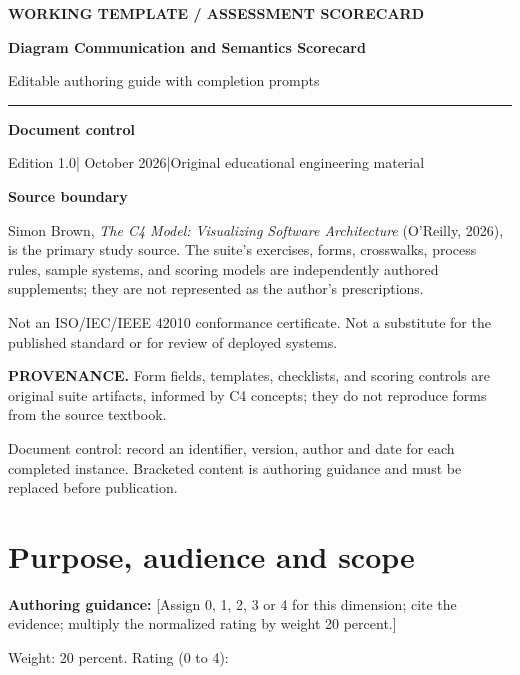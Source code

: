 \documentclass[10pt,letterpaper]{article}
\newcommand{\Prompter}[1]{\par{\small\color{C4Teal}\textbf{Authoring guidance:} #1}\par}
\newcommand{\SourceNote}[1]{\par\smallskip\noindent\colorbox{C4Light}{\parbox{0.94\linewidth}{\footnotesize\textbf{PROVENANCE.} #1}}\par\medskip}
\newcommand{\DocStart}[3]{%
\begin{document}
\begin{titlepage}
\renewcommand{\thepage}{title-\arabic{page}}
\vspace*{0.55in}
{\sffamily\bfseries\small\color{C4Teal}#1}\par\vspace{0.24in}
{\sffamily\bfseries\fontsize{26}{31}\selectfont\color{C4Navy}#2}\par\vspace{0.18in}
{\large\color{C4Gray}#3}\par\vspace{0.4in}
\textcolor{C4Teal}{\rule{\linewidth}{1.15pt}}\par\vspace{0.24in}
\textbf{Document control}\par
Edition 1.0\quad|\quad 30 October 2026\quad|\quad Original educational engineering material\par
\vspace{0.17in}
\textbf{Source boundary}\par
Simon Brown, \emph{The C4 Model: Visualizing Software Architecture} (O'Reilly, 2026), is the primary study source. The suite's exercises, forms, crosswalks, process rules, sample systems, and scoring models are independently authored supplements; they are not represented as the author's prescriptions.\par
\vfill
{\small\color{C4Gray}Not an ISO/IEC/IEEE 42010 conformance certificate. Not a substitute for the published standard or for review of deployed systems.}\par
\end{titlepage}
}
\DocStart{WORKING TEMPLATE / ASSESSMENT SCORECARD}{Diagram Communication and Semantics Scorecard}{Editable authoring guide with completion prompts}
\SourceNote{Form fields, templates, checklists, and scoring controls are original suite artifacts, informed by C4 concepts; they do not reproduce forms from the source textbook.}
Document control: record an identifier, version, author and date for each completed instance. Bracketed content is authoring guidance and must be replaced before publication.

\section{Purpose, audience and scope}

\Prompter{[Assign 0, 1, 2, 3 or 4 for this dimension; cite the evidence; multiply the normalized rating by weight 20 percent.] }
Weight: 20 percent. Rating (0 to 4):
\end{document}
